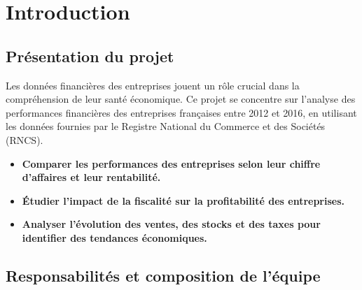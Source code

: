 \documentclass[mstat,12pt]{unswthesis}
\begin{document}


\afterpreface





%
%






\chapter{Introduction}\label{introduction}

\section{Présentation du projet}\label{pruxe9sentation-du-projet}

Les données financières des entreprises jouent un rôle crucial dans la
compréhension de leur santé économique. Ce projet se concentre sur
l'analyse des performances financières des entreprises françaises entre
2012 et 2016, en utilisant les données fournies par le Registre National
du Commerce et des Sociétés (RNCS).

\bigskip

\begin{itemize}[label=$\circ$]
    \item \textbf{Comparer les performances des entreprises selon leur chiffre d'affaires et leur rentabilité.}
    \item \textbf{Étudier l’impact de la fiscalité sur la profitabilité des entreprises.}
    \item \textbf{Analyser l’évolution des ventes, des stocks et des taxes pour identifier des tendances économiques.}
\end{itemize}

\medskip

\section{Responsabilités et composition de
l'équipe}\label{responsabilituxe9s-et-composition-de-luxe9quipe}

\medskip
\end{document}
